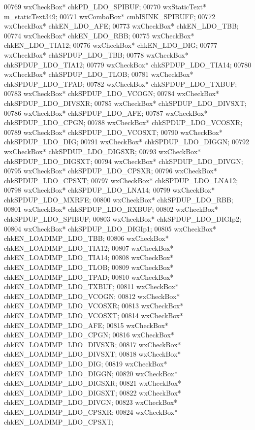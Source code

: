 \begin{DoxyCode}
00769         wxCheckBox* chkPD_LDO_SPIBUF;
00770         wxStaticText* m_staticText349;
00771         wxComboBox* cmbISINK_SPIBUFF;
00772         wxCheckBox* chkEN_LDO_AFE;
00773         wxCheckBox* chkEN_LDO_TBB;
00774         wxCheckBox* chkEN_LDO_RBB;
00775         wxCheckBox* chkEN_LDO_TIA12;
00776         wxCheckBox* chkEN_LDO_DIG;
00777         wxCheckBox* chkSPDUP_LDO_TBB;
00778         wxCheckBox* chkSPDUP_LDO_TIA12;
00779         wxCheckBox* chkSPDUP_LDO_TIA14;
00780         wxCheckBox* chkSPDUP_LDO_TLOB;
00781         wxCheckBox* chkSPDUP_LDO_TPAD;
00782         wxCheckBox* chkSPDUP_LDO_TXBUF;
00783         wxCheckBox* chkSPDUP_LDO_VCOGN;
00784         wxCheckBox* chkSPDUP_LDO_DIVSXR;
00785         wxCheckBox* chkSPDUP_LDO_DIVSXT;
00786         wxCheckBox* chkSPDUP_LDO_AFE;
00787         wxCheckBox* chkSPDUP_LDO_CPGN;
00788         wxCheckBox* chkSPDUP_LDO_VCOSXR;
00789         wxCheckBox* chkSPDUP_LDO_VCOSXT;
00790         wxCheckBox* chkSPDUP_LDO_DIG;
00791         wxCheckBox* chkSPDUP_LDO_DIGGN;
00792         wxCheckBox* chkSPDUP_LDO_DIGSXR;
00793         wxCheckBox* chkSPDUP_LDO_DIGSXT;
00794         wxCheckBox* chkSPDUP_LDO_DIVGN;
00795         wxCheckBox* chkSPDUP_LDO_CPSXR;
00796         wxCheckBox* chkSPDUP_LDO_CPSXT;
00797         wxCheckBox* chkSPDUP_LDO_LNA12;
00798         wxCheckBox* chkSPDUP_LDO_LNA14;
00799         wxCheckBox* chkSPDUP_LDO_MXRFE;
00800         wxCheckBox* chkSPDUP_LDO_RBB;
00801         wxCheckBox* chkSPDUP_LDO_RXBUF;
00802         wxCheckBox* chkSPDUP_LDO_SPIBUF;
00803         wxCheckBox* chkSPDUP_LDO_DIGIp2;
00804         wxCheckBox* chkSPDUP_LDO_DIGIp1;
00805         wxCheckBox* chkEN_LOADIMP_LDO_TBB;
00806         wxCheckBox* chkEN_LOADIMP_LDO_TIA12;
00807         wxCheckBox* chkEN_LOADIMP_LDO_TIA14;
00808         wxCheckBox* chkEN_LOADIMP_LDO_TLOB;
00809         wxCheckBox* chkEN_LOADIMP_LDO_TPAD;
00810         wxCheckBox* chkEN_LOADIMP_LDO_TXBUF;
00811         wxCheckBox* chkEN_LOADIMP_LDO_VCOGN;
00812         wxCheckBox* chkEN_LOADIMP_LDO_VCOSXR;
00813         wxCheckBox* chkEN_LOADIMP_LDO_VCOSXT;
00814         wxCheckBox* chkEN_LOADIMP_LDO_AFE;
00815         wxCheckBox* chkEN_LOADIMP_LDO_CPGN;
00816         wxCheckBox* chkEN_LOADIMP_LDO_DIVSXR;
00817         wxCheckBox* chkEN_LOADIMP_LDO_DIVSXT;
00818         wxCheckBox* chkEN_LOADIMP_LDO_DIG;
00819         wxCheckBox* chkEN_LOADIMP_LDO_DIGGN;
00820         wxCheckBox* chkEN_LOADIMP_LDO_DIGSXR;
00821         wxCheckBox* chkEN_LOADIMP_LDO_DIGSXT;
00822         wxCheckBox* chkEN_LOADIMP_LDO_DIVGN;
00823         wxCheckBox* chkEN_LOADIMP_LDO_CPSXR;
00824         wxCheckBox* chkEN_LOADIMP_LDO_CPSXT;

\end{DoxyCode}
